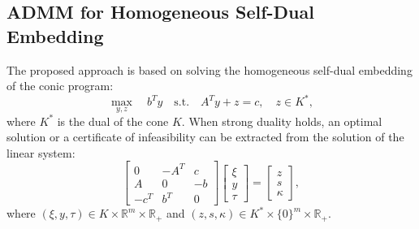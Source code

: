 \documentclass[12pt]{l4dc2021}
\begin{document}
    \subsection{ADMM for Homogeneous Self-Dual Embedding}
        The proposed approach is based on solving the homogeneous self-dual embedding of the conic program:
        \begin{equation}
            \max_{y, z} \quad b^T y \quad \text{s.t.} \quad A^T y + z = c, \quad z \in K^*,
        \end{equation}
        where \( K^* \) is the dual of the cone \( K \). When strong duality holds, an optimal solution or a certificate of infeasibility can be extracted from the solution of the linear system:
        \begin{equation}
            \begin{bmatrix} 0 & -A^T & c \\ A & 0 & -b \\ -c^T & b^T & 0 \end{bmatrix}
            \begin{bmatrix} \xi \\ y \\ \tau \end{bmatrix} =
            \begin{bmatrix} z \\ s \\ \kappa \end{bmatrix},
        \end{equation}
        where \( (\xi, y, \tau) \in K \times \mathbb{R}^m \times \mathbb{R}_+ \) and \( (z, s, \kappa) \in K^* \times \{0\}^m \times \mathbb{R}_+ \).
    
\end{document}
